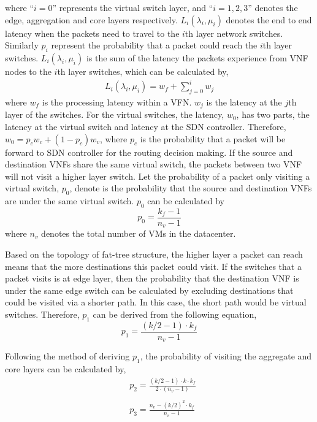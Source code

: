 \noindent where ``$i=0$'' represents the virtual switch layer, and ``$i=1,2,3$'' denotes the edge, aggregation and core layers respectively. ${ L }_{ i }({ \lambda  }_{ i },\mu _{ i })$ denotes the end to end latency when the packets need to travel to the $i$th layer network switches. Similarly $p_i$ represent the probability that a packet could reach the $i$th layer switches. ${ L }_{ i }({ \lambda  }_{ i },\mu _{ i })$ is the sum of the latency the packets experience from VNF nodes to the $i$th layer switches, which can be calculated by, 
\begin{equation}
\label{eq:latency:path}
\begin{split}
{ L }_{ i }({ \lambda  }_{ i },\mu _{ i })={ w }_{ f }+\sum _{ j=0 }^{ i }{ { w }_{ j } } 
\end{split}
\end{equation}
\noindent where $w_{f}$ is the processing latency within a VFN. $w_j$ is the latency at the $j$th layer of the switches. For the virtual switches, the latency, $w_0$, has two parts, the latency at the virtual switch and latency at the SDN controller. Therefore, $w_0=p_cw_c + (1-p_c)w_v$, where $p_c$ is the probability that a packet will be forward to SDN controller for the routing decision making. If the source and destination VNFs share the same virtual switch, the packets between two VNF will not visit a higher layer switch. Let the probability of a packet only visiting a virtual switch, $p_0$, denote is the probability that the source and destination VNFs are under the same virtual switch. $p_0$ can be calculated by 
\begin{equation}
\label{eq:p_vm}
p_{0} = \frac{k_{f} - 1}{n_v - 1}
\end{equation}
\noindent where $n_v$ denotes the total number of VMs in the datacenter.

Based on the topology of fat-tree structure, the higher layer a packet can reach means that the more destinations this packet could visit. If the switches that a packet visits is at edge layer, then the probability that the destination VNF is under the same edge switch can be calculated by excluding destinations that could be visited via a shorter path. In this case, the short path would be virtual switches. Therefore, $p_1$ can be derived from the following equation, 
\begin{equation}
\label{eq:p_edge}
p_{1} = \frac{(k/2-1) \cdot k_{f}}{n_v - 1}
\end{equation}

Following the method of deriving $p_1$, the probability of visiting the aggregate and core layers can be calculated by,
\begin{align}
\label{eq:p_agg_core}
&p_{ 2 }=\frac { (k/2-1)\cdot k\cdot k_{ f } }{ 2\cdot (n_{ v }-1) } \\ \nonumber \\
&p_{3} = \frac{n_v - (k/2)^2 \cdot k_{f}}{n_v - 1}
\end{align}

